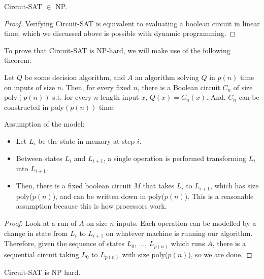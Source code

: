 \begin{theorem}
\claimlabel

Circuit-SAT $\in$ NP.
\end{theorem}

\begin{proof}
Verifying Circuit-SAT is equivalent to evaluating a boolean circuit in linear time, which we discussed above is possible with dynamic programming.
\end{proof}

To prove that Circuit-SAT is NP-hard, we will make use of the following theorem:

\begin{theorem}
\thmlabel

Let $Q$ be some decision algorithm, and $A$ an algorithm solving $Q$ in $p(n)$ time on inputs of size $n$. Then, for every fixed $n$, there is a Boolean circuit $C_n$ of size $\text{poly}(p(n))$ s.t. for every $n$-length input $x$, $Q(x) = C_n(x)$. And, $C_n$ can be constructed in $\text{poly}(p(n))$ time. 
\end{theorem}

Assumption of the model:
\begin{itemize}
    \item Let $L_i$ be the state in memory at step $i$. 
    \item Between states $L_i$ and $L_{i+1}$, a single operation is performed transforming $L_i$ into $L_{i+1}$. 
    \item Then, there is a fixed boolean circuit $M$ that takes $L_i$ to $L_{i+1}$, which has size poly($p(n)$), and can be written down in poly($p(n)$). This is a reasonable assumption because this is how processors work. 
\end{itemize}

\begin{proof}
Look at a run of $A$ on size $n$ inputs. Each operation can be modelled by a change in state from $L_i$ to $L_{i+1}$ on whatever machine is running our algorithm. Therefore, given the sequence of states $L_0$, $\hdots$, $L_{p(n)}$ which runs $A$, there is a sequential circuit taking $L_0$ to $L_{p(n)}$ with size poly($p(n)$), so we are done.
\end{proof}

\begin{theorem}
\thmlabel

Circuit-SAT is NP hard. 
\end{theorem}

